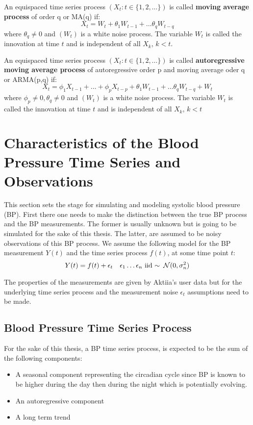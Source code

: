 \begin{example}
    An equispaced time series process $(X_t: t \in \{1,2, \dots\})$ is called \textbf{moving average process}
    of order q or MA(q) if:
    \[
        X_t = W_t + \theta_1 W_{t-1} + \dots \theta_q W_{t-q}
    \]
    where $\theta_q \neq 0$ and $(W_t)$ is a white noise process.
    The variable $W_t$ is called the innovation at time $t$ and is independent of all $X_k$, $k < t$.
\end{example}


\begin{example}
    An equispaced time series process $(X_t: t \in \{1,2, \dots\})$ is called \textbf{autoregressive moving average process}
    of autoregressive order p and moving average oder q or ARMA(p,q) if:
    \[
        X_t =  \phi_1 X_{t-1} + \dots + \phi_p X_{t-p} + \theta_1 W_{t-1} + \dots \theta_q W_{t-q} + W_t
    \]
    where $\phi_p \neq 0, \theta_q \neq 0$ and $(W_t)$ is a white noise process.
    The variable $W_t$ is called the innovation at time $t$ and is independent of all $X_k$, $k < t$

\end{example}




\section{Characteristics of the Blood Pressure Time Series and Observations}\label{sec:characteristics-of-the-blood-pressure-time-series}

This section sets the stage for simulating and modeling systolic blood pressure (BP).
First there one needs to make the distinction between the
true BP process and the BP measurements.
The former is usually unknown but is going to be simulated for the sake of this thesis.
The latter, are assumed to be noisy observations of this BP process.
We assume the following model for the BP measurement $Y(t)$
and the time series process $f(t)$, at some time point $t$:
\begin{align*}
    Y(t) = f(t) + \epsilon_t && \epsilon_1 \dots \epsilon_n \text{ iid }{\sim} \text{ } \operatorname{\mathcal{N}}(0, \sigma_n^{2})
\end{align*}

The properties of the measurements are given by Aktiia's
user data but for the underlying time series process and the measurement noise
$\epsilon_t$ assumptions need to be made.


\subsection{Blood Pressure Time Series Process}\label{subsec:blood-pressure-time-series-process}
For the sake of this thesis, a BP time series process,
is expected to be the sum of the following components:
\begin{itemize}
    \item A seasonal component representing the circadian cycle since BP is known to be higher during the day then during the night
    which is potentially evolving.
    \item An autoregressive component
    \item A long term trend
\end{itemize}


